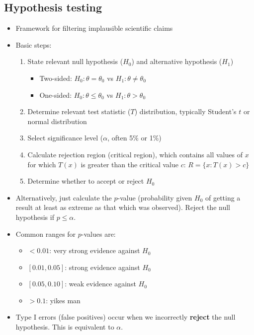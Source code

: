 \documentclass{article}
\begin{document}
\begin{multicols*}{2}


\subsection{Hypothesis testing}
\begin{itemize}
    \item Framework for filtering implausible scientific claims
    \item Basic steps:
    \begin{enumerate}
        \item State relevant null hypothesis ($H_0$) and alternative hypothesis ($H_1$)
        \begin{itemize}
            \item Two-sided: $H_0: \theta = \theta_0$ vs $H_1: \theta \neq \theta_0$
            \item One-sided: $H_0: \theta \leq \theta_0$ vs $H_1: \theta > \theta_0$
        \end{itemize}
        \item Determine relevant test statistic ($T$) distribution, typically Student's $t$ or normal distribution
        \item Select significance level ($\alpha$, often 5\% or 1\%)
        \item Calculate rejection region (critical region), which contains all values of $x$ for which $T(x)$ is greater than the critical value $c$: $R = \{x: T(x) > c\}$
        \item Determine whether to accept or reject $H_0$
    \end{enumerate}
    \item Alternatively, just calculate the $p$-value (probability given $H_0$ of getting a result at least as extreme as that which was observed). Reject the null hypothesis if $p \leq \alpha$.
    \item Common ranges for $p$-values are:
    \begin{itemize}
        \item $< 0.01$: very strong evidence against $H_0$
        \item $[0.01, 0.05]$: strong evidence against $H_0$
        \item $[0.05, 0.10]$: weak evidence against $H_0$
        \item $> 0.1$: yikes man
    \end{itemize}
    \item Type I errors (false positives) occur when we incorrectly \textbf{reject} the null hypothesis. This is equivalent to $\alpha$.

\end{itemize}
\end{multicols*}
\end{document}
